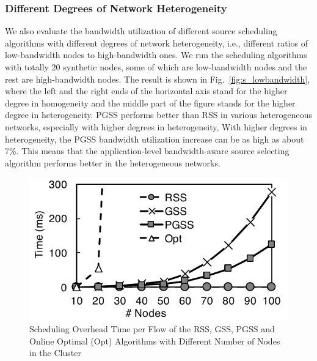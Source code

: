 \documentclass[10pt,journal,compsoc]{IEEEtran}
\begin{document}
\subsubsection{Different Degrees of Network Heterogeneity}
We also evaluate the bandwidth utilization of different source scheduling algorithms 
with different degrees of network heterogeneity, 
i.e., different ratios of low-bandwidth nodes to high-bandwidth ones. 
We run the scheduling algorithms with totally 20 synthetic nodes, 
some of which are low-bandwidth nodes and the rest are high-bandwidth nodes. 
The result is shown in Fig.~\ref{fig:s_lowbandwidth}, 
where the left and the right ends of the horizontal axis stand for the higher
degree in homogeneity
and the middle part of the figure stands for the higher degree in heterogeneity. 
PGSS performs better than RSS in various heterogeneous networks, 
especially with higher degrees in heterogeneity, 
With higher degrees in heterogeneity, the PGSS bandwidth utilization
increase can be as high as about 7\%. 
This means that the application-level bandwidth-aware source selecting algorithm
performs better in the heterogeneous networks.

\begin{figure}[!t]
\centering

\includegraphics[width=0.7\columnwidth,height=0.4\columnwidth]{figure15}

\caption{Scheduling Overhead Time per Flow of the RSS, GSS, PGSS and Online Optimal (Opt) Algorithms with Different Number of Nodes in the Cluster}
\label{fig:s_overhead}
\end{figure}
\end{document}
